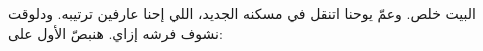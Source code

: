 %
%
%
%
%
%
%

\VUsaut{6.0mm}
\VUsaut{1.4mm}
\VUsaut{0.4mm}
\VUsaut{2.2mm}

البيت خلص. وعمّ يوحنا اتنقل في مسكنه الجديد، اللي إحنا عارفين ترتيبه. ودلوقت
نشوف فرشه إزاي. هنبصّ الأول على:

